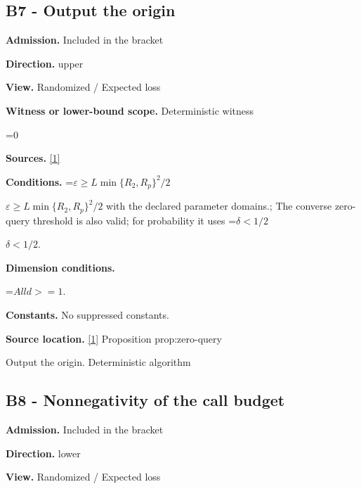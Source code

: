 \documentclass[10pt,a4paper]{article}
\newcommand{\AtlasMath}[1]{\par\begingroup\centering\setbox0=\hbox{$\displaystyle #1$}\ifdim\wd0>1.4\linewidth\typeout{ATLAS WIDE FORMULA: \the\wd0}\fi\ifdim\wd0>\linewidth\resizebox{\linewidth}{!}{\box0}\else\box0\fi\par\endgroup}
\newcommand{\AtlasInlineMath}[1]{\begingroup\setbox0=\hbox{$#1$}\ifdim\wd0>.4\linewidth\endgroup\AtlasMath{#1}\else\endgroup$#1$\fi}
\begin{document}
\subsection{B7 - Output the origin}


\textbf{Admission.} Included in the bracket



\textbf{Direction.} upper



\textbf{View.} Randomized / Expected loss



\textbf{Witness or lower-bound scope.} Deterministic witness



\AtlasMath{0}


\textbf{Sources.} \href{https://github.com/WU-Wendao/Colombo/blob/main/colombo_sensorium/Complexity_altas/data/sources/colombo/U02/manuscript.pdf}{[1]}



\textbf{Conditions.} \AtlasInlineMath{\varepsilon\ge L\min\{R_2,R_p\}^2/2} with the declared parameter domains.; The converse zero-query threshold is also valid; for probability it uses \AtlasInlineMath{\delta<1/2}.



\textbf{Dimension conditions.}



\AtlasMath{All d>=1.}


\textbf{Constants.} No suppressed constants.



\textbf{Source location.} \href{https://github.com/WU-Wendao/Colombo/blob/main/colombo_sensorium/Complexity_altas/data/sources/colombo/U02/manuscript.pdf}{[1]} Proposition prop:zero-query



Output the origin. Deterministic algorithm



\subsection{B8 - Nonnegativity of the call budget}


\textbf{Admission.} Included in the bracket



\textbf{Direction.} lower



\textbf{View.} Randomized / Expected loss
\end{document}
